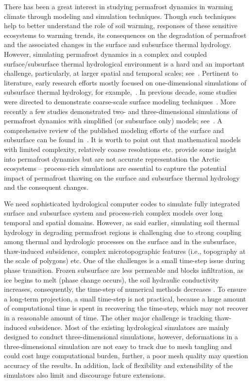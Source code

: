 \documentclass[review]{elsarticle}
\begin{document}
There has been a great interest in studying permafrost dynamics in warming climate through modeling and simulation techniques. Though such techniques help to better understand the role of soil warming, responses of these sensitive ecosystems to warming trends, its consequences on the degradation of permafrost and the associated changes in the surface and subsurface thermal hydrology. However, simulating permafrost dynamics in a complex and coupled surface/subsurface thermal hydrological environment is a hard and an important challenge, particularly, at larger spatial and temporal scales; see~\cite{painter2013modeling}. Pertinent to literature, early research efforts mostly focused on one-dimensional simulations of subsurface thermal hydrology, for example,~\cite{harlan1973analysis, guymon1974coupled, taylor1978model}. In previous decade, some studies were directed to demonstrate coarse-scale surface modeling techniques~\cite{takata2003development, nicolsky2007improved, mckenzie2007groundwater}. More recently a few studies demonstrated two- and three-dimensional simulations of permafrost dynamics with simplified (or subsurface only) models; see~\cite{bense2009evolution, lawrence2012simulation, koven2013analysis, karra2014three}. A comprehensive review of the published modeling efforts of the surface and subsurface can be found in~\cite{kurylyk2014climate}. It is worth to point out that mathematical models with limited complexity, relatively coarse resolutions etc. provide some insight into permafrost dynamics but are not accurate representation the Arctic ecosystems -- process-rich simulations are essential to capture the potential impact of permafrost thawing on the surface and subsurface thermal hydrology and the consequent changes.

We need sophisticated hydrological computer codes to simulate fully integrated surface and subsurface system and process-rich complex models over long temporal and spatial domains. However, as said earlier, simulating soil thermal hydrology in degrading permafrost regions is challenging due to strong coupling among thermal and hydrologic processes on the surface and in the subsurface, thaw-induced subsidence, complex microtopographic features (i.e., topography at the scale of polygons) etc. One of the challenges is a small time-step issue during phase transition. Frozen subsurface are less permeable and blocks infiltration, as ice begins to melt (phase change occurs), the soil hydraulic conductivity increases, consequently, the time-step of numerical methods decreases \cite{dall2011robust}. To ensure a long-term projection, a small time-step is not practical, because a huge amount of computational time is spent in recovering the time-step, which may not recover in a reasonable amount of time. The other major challenge is tracking thaw-induced subsidence. Most of the existing hydrological simulators are mainly designed to conduct three-dimensional simulations, however, deformations in a three-dimensional simulation are not easy to track due to mesh tangling and could cost huge computational burden, further, a poor mesh quality may question accuracy of the results. In addition, lack of flexibility and extensibility of the simulators also limit and discourage future extensions.
\end{document}
